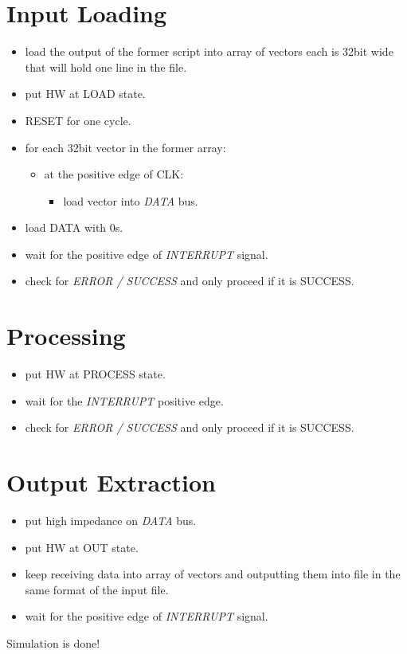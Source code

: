 \documentclass[12pt]{report}
\begin{document}
\section{Input Loading}
\begin{itemize}
    \item load the output of the former script into array of vectors each is 32bit wide that will hold one line in the file.
    \item put HW at LOAD state.
    \item RESET for one cycle.
    \item for each 32bit vector in the former array:
    \begin{itemize}
        \item at the positive edge of CLK:
        \begin{itemize}
            \item load vector into \emph{DATA} bus.
        \end{itemize}
    \end{itemize}
    \item load DATA with 0s.
    \item wait for the positive edge of \emph{INTERRUPT} signal.
    \item check for \emph{ERROR / SUCCESS} and only proceed if it is SUCCESS.
\end{itemize}

\section{Processing}
\begin{itemize}
    \item put HW at PROCESS state.
    \item wait for the \emph{INTERRUPT} positive edge.
    \item check for \emph{ERROR / SUCCESS} and only proceed if it is SUCCESS.
\end{itemize}

\section{Output Extraction}
\begin{itemize}
    \item put high impedance on \emph{DATA} bus.
    \item put HW at OUT state.
    \item keep receiving data into array of vectors and outputting them into file in the same format of the input file.
    \item wait for the positive edge of \emph{INTERRUPT} signal. 
\end{itemize}
Simulation is done! 
\end{document}

